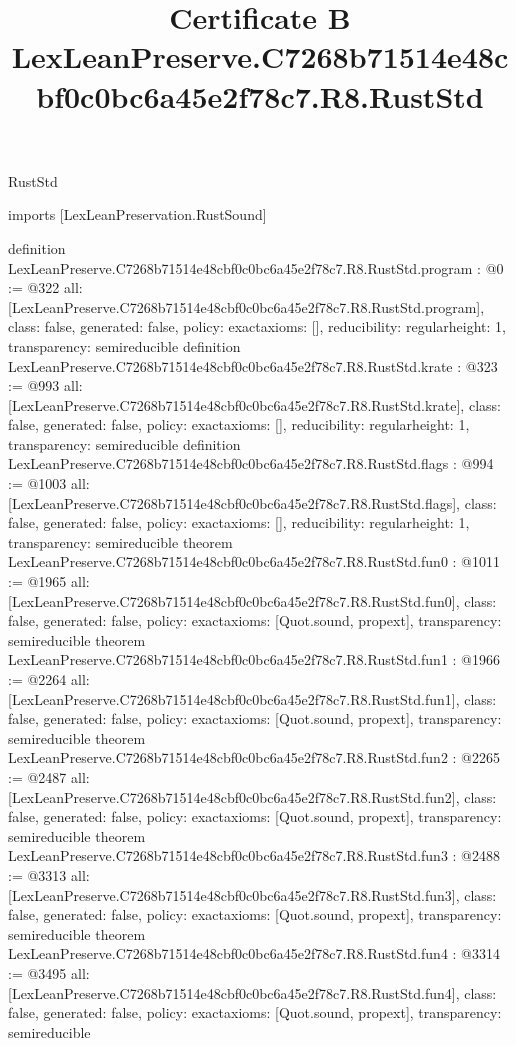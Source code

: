 \begin{lexlean}{RustStd}
\title{Certificate B LexLeanPreserve.C7268b71514e48cbf0c0bc6a45e2f78c7.R8.RustStd}
\begin{coremodule}
imports [LexLeanPreservation.RustSound]

definition LexLeanPreserve.C7268b71514e48cbf0c0bc6a45e2f78c7.R8.RustStd.program : @0 := @322 {
  all: [LexLeanPreserve.C7268b71514e48cbf0c0bc6a45e2f78c7.R8.RustStd.program],
  class: false,
  generated: false,
  policy: exact{axioms: []},
  reducibility: regular{height: 1},
  transparency: semireducible
}
definition LexLeanPreserve.C7268b71514e48cbf0c0bc6a45e2f78c7.R8.RustStd.krate : @323 := @993 {
  all: [LexLeanPreserve.C7268b71514e48cbf0c0bc6a45e2f78c7.R8.RustStd.krate],
  class: false,
  generated: false,
  policy: exact{axioms: []},
  reducibility: regular{height: 1},
  transparency: semireducible
}
definition LexLeanPreserve.C7268b71514e48cbf0c0bc6a45e2f78c7.R8.RustStd.flags : @994 := @1003 {
  all: [LexLeanPreserve.C7268b71514e48cbf0c0bc6a45e2f78c7.R8.RustStd.flags],
  class: false,
  generated: false,
  policy: exact{axioms: []},
  reducibility: regular{height: 1},
  transparency: semireducible
}
theorem LexLeanPreserve.C7268b71514e48cbf0c0bc6a45e2f78c7.R8.RustStd.fun0 : @1011 := @1965 {
  all: [LexLeanPreserve.C7268b71514e48cbf0c0bc6a45e2f78c7.R8.RustStd.fun0],
  class: false,
  generated: false,
  policy: exact{axioms: [Quot.sound, propext]},
  transparency: semireducible
}
theorem LexLeanPreserve.C7268b71514e48cbf0c0bc6a45e2f78c7.R8.RustStd.fun1 : @1966 := @2264 {
  all: [LexLeanPreserve.C7268b71514e48cbf0c0bc6a45e2f78c7.R8.RustStd.fun1],
  class: false,
  generated: false,
  policy: exact{axioms: [Quot.sound, propext]},
  transparency: semireducible
}
theorem LexLeanPreserve.C7268b71514e48cbf0c0bc6a45e2f78c7.R8.RustStd.fun2 : @2265 := @2487 {
  all: [LexLeanPreserve.C7268b71514e48cbf0c0bc6a45e2f78c7.R8.RustStd.fun2],
  class: false,
  generated: false,
  policy: exact{axioms: [Quot.sound, propext]},
  transparency: semireducible
}
theorem LexLeanPreserve.C7268b71514e48cbf0c0bc6a45e2f78c7.R8.RustStd.fun3 : @2488 := @3313 {
  all: [LexLeanPreserve.C7268b71514e48cbf0c0bc6a45e2f78c7.R8.RustStd.fun3],
  class: false,
  generated: false,
  policy: exact{axioms: [Quot.sound, propext]},
  transparency: semireducible
}
theorem LexLeanPreserve.C7268b71514e48cbf0c0bc6a45e2f78c7.R8.RustStd.fun4 : @3314 := @3495 {
  all: [LexLeanPreserve.C7268b71514e48cbf0c0bc6a45e2f78c7.R8.RustStd.fun4],
  class: false,
  generated: false,
  policy: exact{axioms: [Quot.sound, propext]},
  transparency: semireducible
}
\end{coremodule}
\end{lexlean}
